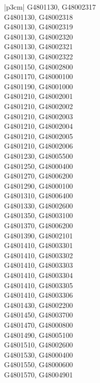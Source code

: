 \begin{customLongTable}{ |p{3cm}| }
G4801130, G48002317 \\ \hline
G4801130, G48002318 \\ \hline
G4801130, G48002319 \\ \hline
G4801130, G48002320 \\ \hline
G4801130, G48002321 \\ \hline
G4801130, G48002322 \\ \hline
G4801150, G48002800 \\ \hline
G4801170, G48000100 \\ \hline
G4801190, G48001000 \\ \hline
G4801210, G48002001 \\ \hline
G4801210, G48002002 \\ \hline
G4801210, G48002003 \\ \hline
G4801210, G48002004 \\ \hline
G4801210, G48002005 \\ \hline
G4801210, G48002006 \\ \hline
G4801230, G48005500 \\ \hline
G4801250, G48000400 \\ \hline
G4801270, G48006200 \\ \hline
G4801290, G48000100 \\ \hline
G4801310, G48006400 \\ \hline
G4801330, G48002600 \\ \hline
G4801350, G48003100 \\ \hline
G4801370, G48006200 \\ \hline
G4801390, G48002101 \\ \hline
G4801410, G48003301 \\ \hline
G4801410, G48003302 \\ \hline
G4801410, G48003303 \\ \hline
G4801410, G48003304 \\ \hline
G4801410, G48003305 \\ \hline
G4801410, G48003306 \\ \hline
G4801430, G48002200 \\ \hline
G4801450, G48003700 \\ \hline
G4801470, G48000800 \\ \hline
G4801490, G48005100 \\ \hline
G4801510, G48002600 \\ \hline
G4801530, G48000400 \\ \hline
G4801550, G48000600 \\ \hline
G4801570, G48004901 \\ \hline

\end{customLongTable}
